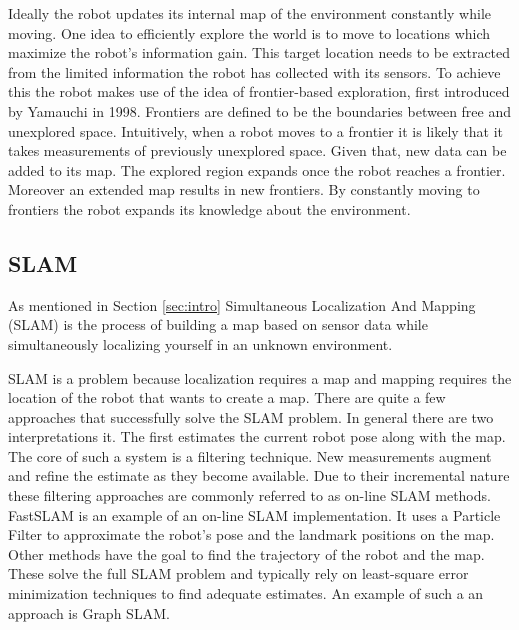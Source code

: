 \documentclass{ba-kecs}
\begin{document}
Ideally the robot updates its internal map of the environment constantly while moving. One idea to efficiently explore the world is to move to locations which maximize the robot's information gain. This target location needs to be extracted from the limited information the robot has collected with its sensors.
To achieve this the robot makes use of the idea of frontier-based exploration, first introduced by Yamauchi \cite{Yamauchi} in 1998. Frontiers are defined to be the boundaries between free and unexplored space. Intuitively, when a robot moves to a frontier it is likely that it takes measurements of previously unexplored space. Given that, new data can be added to its map. The explored region expands once the robot reaches a frontier. Moreover an extended map results in new frontiers. By constantly moving to frontiers the robot expands its knowledge about the environment.

\subsection{SLAM}
\label{subsec:sotaSlam}
As mentioned in Section \ref{sec:intro} Simultaneous Localization And Mapping (SLAM) is the process of building a map based on sensor data while simultaneously localizing yourself in an unknown environment.

SLAM is a problem because localization requires a map and mapping requires the location of the robot that wants to create a map. There are quite a few approaches that successfully solve the SLAM problem. 
In general there are two interpretations it. The first estimates the current robot pose along with the map. The core of such a system is a filtering technique. New measurements augment and refine the estimate as they become available. Due to their incremental nature these filtering approaches are commonly referred to as on-line SLAM methods. FastSLAM \citep{Montemerlo02} is an example of an on-line SLAM implementation. It uses a Particle Filter to approximate the robot's pose and the landmark positions on the map. Other methods have the goal to find the trajectory of the robot and the map. These solve the full SLAM problem and typically rely on least-square error minimization techniques \cite{Leastsquares} to find adequate estimates.  
An example of such a an approach is Graph SLAM.
\end{document}
